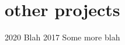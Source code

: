 \section{other projects}

\begin{entrylist}
    \simpleentry
      {2020}
      {Blah}
      {}
    \simpleentry
      {2017}
      {Some more blah}
      {}
\end{entrylist}

